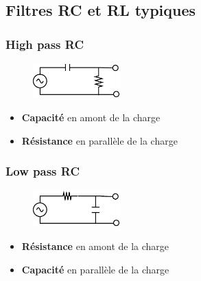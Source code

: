 \documentclass[a4paper]{article}
\begin{document}
    \subsection{Filtres RC et RL typiques}
    \subsubsection{High pass RC}
    \begin{figure}[H]
        \begin{center}
            \includegraphics[width=0.3\textwidth]{fig/2_rcHP.eps}
        \end{center}
    \end{figure}
    \begin{itemize}
        \item \textbf{Capacité} en amont de la charge
        \item \textbf{Résistance} en parallèle de la charge
    \end{itemize}

    \subsubsection{Low pass RC}
    \begin{figure}[H]
        \begin{center}
            \includegraphics[width=0.3\textwidth]{fig/2_rcLP.eps}
        \end{center}
    \end{figure}
    \begin{itemize}
        \item \textbf{Résistance} en amont de la charge
        \item \textbf{Capacité} en parallèle de la charge
    \end{itemize}
\end{document}
